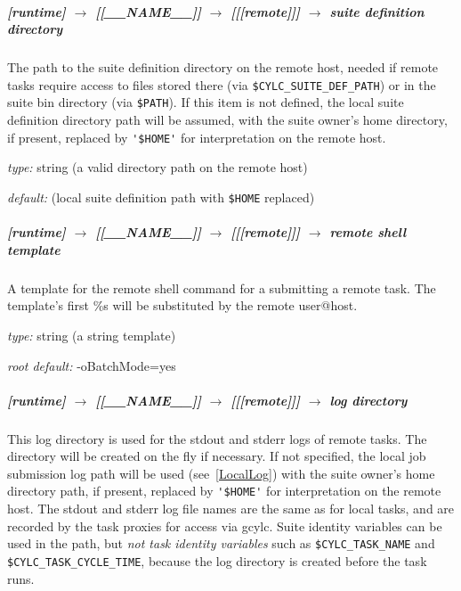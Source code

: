\subparagraph[suite definition directory]{[runtime] $\rightarrow$ [[\_\_NAME\_\_]] $\rightarrow$ [[[remote]]] $\rightarrow$  suite definition directory}

The path to the suite definition directory on the remote host, needed if
remote tasks require access to files stored there (via
\lstinline=$CYLC_SUITE_DEF_PATH=) or in the suite bin directory (via
\lstinline=$PATH=).  If this item is not defined, the local suite
definition directory path will be assumed, with the suite owner's home
directory, if present, replaced by \lstinline='$HOME'= for
interpretation on the remote host. 

\begin{myitemize}
\item {\em type:} string (a valid directory path on the remote host)
\item {\em default:} (local suite definition path with \lstinline=$HOME=
    replaced)
\end{myitemize}
 
\subparagraph[remote shell template]{[runtime] $\rightarrow$ [[\_\_NAME\_\_]] $\rightarrow$ [[[remote]]] $\rightarrow$ remote shell template }

A template for the remote shell command for a submitting a remote task.
The template's first \%s will be substituted by the remote user@host.

\begin{myitemize}
\item {\em type:} string (a string template)
\item {\em root default:} \lstinline@ssh -oBatchMode=yes %s@
\end{myitemize}

\subparagraph[log directory]{[runtime] $\rightarrow$ [[\_\_NAME\_\_]] $\rightarrow$ [[[remote]]] $\rightarrow$ log directory }

This log directory is used for the stdout and stderr logs of remote
tasks. The directory will be created on the fly if necessary. If not
specified, the local job submission log path will be used
(see~\ref{LocalLog}) with the
suite owner's home directory path, if present, replaced by
\lstinline='$HOME'= for interpretation on the remote host. The stdout
and stderr log file names are the same as for local tasks, and are
recorded by the task proxies for access via gcylc. Suite identity
variables can be used in the path, but {\em not task identity variables}
such as \lstinline=$CYLC_TASK_NAME= and \lstinline=$CYLC_TASK_CYCLE_TIME=, 
because the log directory is created before the task runs.

